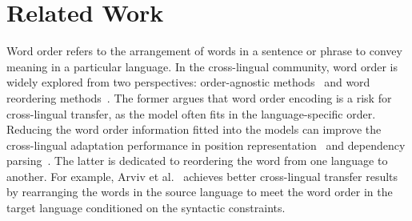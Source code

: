 \section{Related Work}
Word order refers to the arrangement of words in a sentence or phrase to convey meaning in a particular language. In the cross-lingual community, word order is widely explored from two perspectives: order-agnostic methods~\cite{ahmad-etal-2019-difficulties, Liu_Winata_Cahyawijaya_Madotto_Lin_Fung_2021, ding-etal-2020-self, DBLP:journals/corr/abs-2305-19857, DBLP:journals/corr/abs-1910-12391, hessel-schofield-2021-effective} and word reordering methods~\cite{rasooli-collins-2019-low, ji-etal-2021-word, liu-etal-2020-cross-lingual-dependency, chen-etal-2019-neural, goyal-durrett-2020-neural, al-negheimish-etal-2023-towards, pham-etal-2021-order}. The former argues that word order encoding is a risk for cross-lingual transfer, as the model often fits in the language-specific order. Reducing the word order information fitted into the models can improve the cross-lingual adaptation performance in position representation~\cite{ding-etal-2020-self} and dependency parsing~\cite{ahmad-etal-2019-difficulties, Liu_Winata_Cahyawijaya_Madotto_Lin_Fung_2021}. The latter is dedicated to reordering the word from one language to another. For example, Arviv et al.~\cite{arviv-etal-2023-improving} achieves better cross-lingual transfer results by rearranging the words in the source language to meet the word order in the target language conditioned on the syntactic constraints.